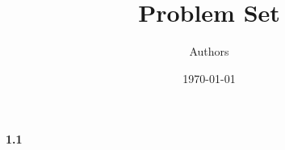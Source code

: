 \documentclass[10pt]{article}
\title{Problem Set}
\author{Authors}
\date{\today}
\begin{document}
\maketitle


\section{ }

\paragraph{1.1}
\end{document}
